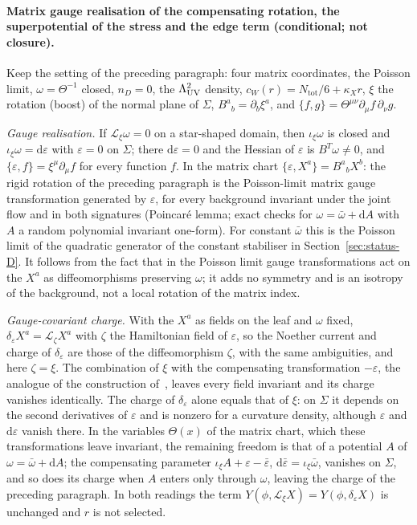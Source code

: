 \paragraph{Matrix gauge realisation of the compensating rotation, the superpotential of the stress and the edge term (conditional; not closure).}
Keep the setting of the preceding paragraph: four matrix coordinates, the Poisson limit, \(\omega=\Theta^{-1}\) closed, \(n_D=0\), the \(\Lambda_{\mathrm{UV}}^2\) density, \(c_W(r)=N_{\mathrm{tot}}/6+\kappa_Xr\), \(\xi\) the rotation (boost) of the normal plane of \(\Sigma\), \(B^a{}_b=\partial_b\xi^a\), and \(\{f,g\}=\Theta^{\mu\nu}\partial_\mu f\,\partial_\nu g\).

\emph{Gauge realisation.} If \(\mathcal L_\xi\omega=0\) on a star-shaped domain, then \(\iota_\xi\omega\) is closed and \(\iota_\xi\omega=\mathrm d\varepsilon\) with \(\varepsilon=0\) on \(\Sigma\); there \(\mathrm d\varepsilon=0\) and the Hessian of \(\varepsilon\) is \(B^{T}\omega\neq0\), and \(\{\varepsilon,f\}=\xi^\mu\partial_\mu f\) for every function \(f\). In the matrix chart \(\{\varepsilon,X^a\}=B^a{}_bX^b\): the rigid rotation of the preceding paragraph is the Poisson-limit matrix gauge transformation generated by \(\varepsilon\), for every background invariant under the joint flow and in both signatures (Poincar\'e lemma; exact checks for \(\omega=\bar\omega+\mathrm dA\) with \(A\) a random polynomial invariant one-form). For constant \(\bar\omega\) this is the Poisson limit of the quadratic generator of the constant stabiliser in Section~\ref{sec:status-D}. It follows from the fact that in the Poisson limit gauge transformations act on the \(X^a\) as diffeomorphisms preserving \(\omega\); it adds no symmetry and is an isotropy of the background, not a local rotation of the matrix index.

\emph{Gauge-covariant charge.} With the \(X^a\) as fields on the leaf and \(\omega\) fixed, \(\delta_\varepsilon X^a=\mathcal L_\zeta X^a\) with \(\zeta\) the Hamiltonian field of \(\varepsilon\), so the Noether current and charge of \(\delta_\varepsilon\) are those of the diffeomorphism \(\zeta\), with the same ambiguities, and here \(\zeta=\xi\). The combination of \(\xi\) with the compensating transformation \(-\varepsilon\), the analogue of the construction of~\cite{JacobsonMohd2015}, leaves every field invariant and its charge vanishes identically. The charge of \(\delta_\varepsilon\) alone equals that of \(\xi\): on \(\Sigma\) it depends on the second derivatives of \(\varepsilon\) and is nonzero for a curvature density, although \(\varepsilon\) and \(\mathrm d\varepsilon\) vanish there. In the variables \(\Theta(x)\) of the matrix chart, which these transformations leave invariant, the remaining freedom is that of a potential \(A\) of \(\omega=\bar\omega+\mathrm dA\); the compensating parameter \(\iota_\xi A+\varepsilon-\bar\varepsilon\), \(\mathrm d\bar\varepsilon=\iota_\xi\bar\omega\), vanishes on \(\Sigma\), and so does its charge when \(A\) enters only through \(\omega\), leaving the charge of the preceding paragraph. In both readings the term \(Y(\phi,\mathcal L_\xi X)=Y(\phi,\delta_\varepsilon X)\) is unchanged and \(r\) is not selected.

